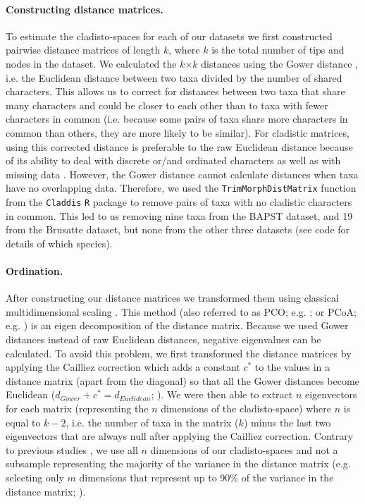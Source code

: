 \documentclass[12pt,a4paper]{article}
\begin{document}
\paragraph{Constructing distance matrices.}
To estimate the cladisto-spaces for each of our datasets we first constructed pairwise distance matrices of length $k$, where $k$ is the total number of tips and nodes in the dataset.
We calculated the $k$$\times$$k$ distances using the Gower distance \citep{Gower71}, i.e. the Euclidean distance between two taxa divided by the number of shared characters. 
This allows us to correct for distances between two taxa that share many characters and could be closer to each other than to taxa with fewer characters in common (i.e. because some pairs of taxa share more characters in common than others, they are more likely to be similar).
For cladistic matrices, using this corrected distance is preferable to the raw Euclidean distance because of its ability to deal with discrete or/and ordinated characters as well as with missing data \citep{anderson2012using}.
However, the Gower distance cannot calculate distances when taxa have no overlapping data.
Therefore, we used the \texttt{TrimMorphDistMatrix} function from the \texttt{Claddis} \texttt{R} package \citep{Claddis} to remove pairs of taxa with no cladistic characters in common.
This led to us removing nine taxa from the BAPST dataset, and 19 from the Brusatte dataset, but none from the other three datasets (see code for details of which species). %

\paragraph{Ordination.}
After constructing our distance matrices we transformed them using classical multidimensional scaling \citep[MDS;][]{torgerson1965multidimensional,GOWER01121966,cailliez1983analytical}.
This method (also referred to as PCO; e.g. \citealt{Brusatte2015}; or PCoA; e.g. \citealt{paradisape:2004}) is an eigen decomposition of the distance matrix.
Because we used Gower distances instead of raw Euclidean distances, negative eigenvalues can be calculated.
To avoid this problem, we first transformed the distance matrices by applying the Cailliez correction \citep{cailliez1983analytical} which adds a constant $c^*$ to the values in a distance matrix (apart from the diagonal) so that all the Gower distances become Euclidean ($d_{Gower}+c^*=d_{Euclidean}$; \citealt{cailliez1983analytical}). 
We were then able to extract $n$ eigenvectors for each matrix (representing the $n$ dimensions of the cladisto-space) where $n$ is equal to $k-2$, i.e. the number of taxa in the matrix ($k$) minus the last two eigenvectors that are always null after applying the Cailliez correction.
Contrary to previous studies \citep[e.g][]{brusatte50,cisneros2010,prentice2011,anderson2012using,Hughes20082013,bentonmodels2014}, we use all $n$ dimensions of our cladisto-spaces and not a subsample representing the majority of the variance in the distance matrix (e.g. selecting only $m$ dimensions that represent up to 90\% of the variance in the distance matrix; \citealt{Brusatte12092008,toljagictriassic-jurassic2013}).
\end{document}
